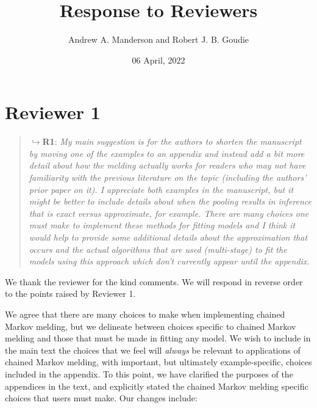 \documentclass[
  10pt,
  a4paper,
]{article}
\title{Response to Reviewers}
\author{Andrew A. Manderson and Robert J. B. Goudie}
\date{06 April, 2022}
\begin{document}
\maketitle

\hypertarget{reviewer-1}{%
\section*{Reviewer 1}\label{reviewer-1}}

\begin{quote}
\(\hookrightarrow\)\textbf{R1}: \emph{My main suggestion is for the
authors to shorten the manuscript by moving one of the examples to an
appendix and instead add a bit more detail about how the melding
actually works for readers who may not have familiarity with the
previous literature on the topic (including the authors' prior paper on
it). I appreciate both examples in the manuscript, but it might be
better to include details about when the pooling results in inference
that is exact versus approximate, for example. There are many choices
one must make to implement these methods for fitting models and I think
it would help to provide some additional details about the approximation
that occurs and the actual algorithms that are used (multi-stage) to fit
the models using this approach which don't currently appear until the
appendix.}
\end{quote}

We thank the reviewer for the kind comments. We will respond in reverse
order to the points raised by Reviewer 1.

We agree that there are many choices to make when implementing chained
Markov melding, but we delineate between choices specific to chained
Markov melding and those that must be made in fitting any model. We wish
to include in the main text the choices that we feel will \emph{always}
be relevant to applications of chained Markov melding, with important,
but ultimately example-specific, choices included in the appendix. To
this point, we have clarified the purposes of the appendices in the
text, and explicitly stated the chained Markov melding specific choices
that users must make. Our changes include:
\end{document}
